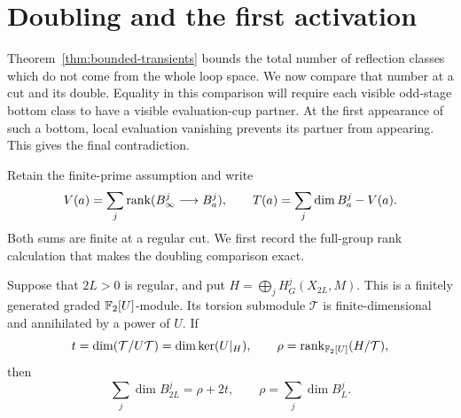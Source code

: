 \section{Doubling and the first activation}\label{sec:activation}

Theorem~\ref{thm:bounded-transients} bounds the total number of reflection
classes which do not come from the whole loop space. We now compare that
number at a cut and its double. Equality in this comparison will require
each visible odd-stage bottom class to have a visible evaluation-cup
partner. At the first appearance of such a bottom, local evaluation
vanishing prevents its partner from appearing. This gives the final
contradiction.

Retain the finite-prime assumption and write
\[
 V(a)=\sum_j\operatorname{rank}(B_\infty^j\longrightarrow B_a^j),
 \qquad
 T(a)=\sum_j\dim B_a^j-V(a).
\]
Both sums are finite at a regular cut. We first record the full-group
rank calculation that makes the doubling comparison exact.

\begin{lemma}\label{act:module-rank}
Suppose that $2L>0$ is regular, and put
$H=\bigoplus_j H_G^j(X_{2L},M)$. This is a finitely generated graded
$\mathbb F_2[U]$-module. Its torsion submodule $\mathcal T$ is finite-dimensional
and annihilated by a power of $U$. If
\[
 t=\dim(\mathcal T/U\mathcal T)=\dim\ker(U|_H),
 \qquad \rho=\operatorname{rank}_{\mathbb F_2[U]}(H/\mathcal T),
\]
then
\begin{equation}\label{act:total-rank}
 \sum_j\dim B_{2L}^j=\rho+2t,
 \qquad \rho=\sum_j\dim B_L^j.
\end{equation}
\end{lemma}

